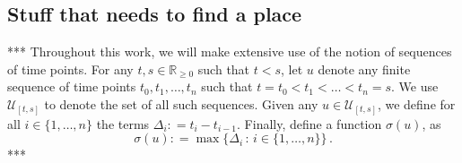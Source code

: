 \documentclass[10pt]{paper}
\theoremstyle{definition}
\newtheorem{lemma}[theorem]{Lemma}
\newcommand{\reals}{\mathbb{R}}
\newcommand{\realsnonneg}{\reals_{\geq 0}}
\newcommand{\norm}[1]{\left\lVert #1 \right\rVert}
\newcommand{\coloneqq}{:\!=}
\begin{document}
%


\subsection{Stuff that needs to find a place}




*** Throughout this work, we will make extensive use of the notion of sequences of time points. For any $t,s\in\realsnonneg$ such that $t<s$, let $u$ denote any finite sequence of time points $t_0,t_1,\ldots,t_n$ such that $t=t_0 < t_1 <\ldots < t_n = s$. We use $\mathcal{U}_{[t,s]}$ to denote the set of all such sequences. 
Given any $u\in\mathcal{U}_{[t,s]}$, we define for all $i\in\{1,\ldots,n\}$ the terms $\Delta_i\coloneqq t_i-t_{i-1}$.  Finally, define a function $\sigma(u)$, as
\begin{equation*}
\sigma(u) \coloneqq \max\bigl\{\Delta_i\,:\,i\in\{1,\ldots,n\}\bigr\}\,.
\end{equation*}
***
\end{document}

